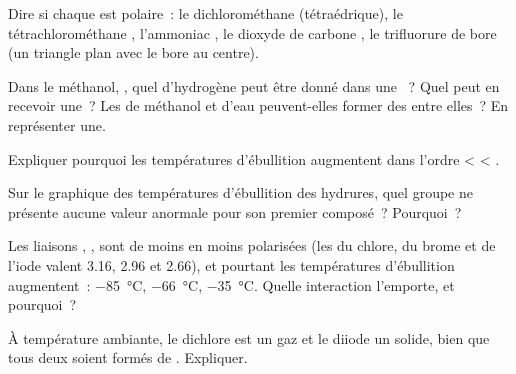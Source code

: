 \begin{exercise}[$\star\star$]\label{exo:g11:polarity-and-cohesion:6}
Dire si chaque  est polaire~: le dichlorométhane 
(tétraédrique), le tétrachlorométhane , l'ammoniac , le
dioxyde de carbone , le trifluorure de bore  (un
triangle plan avec le bore au centre).
\end{exercise}

\begin{exercise}[$\star\star$]\label{exo:g11:polarity-and-cohesion:7}
Dans le méthanol, , quel  d'hydrogène peut être donné
dans une ~? Quel  peut en recevoir une~? Les
 de méthanol et d'eau peuvent-elles former des  entre elles~? En représenter une.
\end{exercise}

\begin{exercise}[$\star\star$]\label{exo:g11:polarity-and-cohesion:8}
Expliquer pourquoi les températures d'ébullition augmentent dans
l'ordre  <  < .
\end{exercise}

\begin{exercise}[$\star\star$]\label{exo:g11:polarity-and-cohesion:9}
Sur le graphique des températures d'ébullition des hydrures, quel
groupe ne présente aucune valeur anormale pour son premier composé~?
Pourquoi~?
\end{exercise}

\begin{exercise}[$\star\star$]\label{exo:g11:polarity-and-cohesion:10}
Les liaisons , ,  sont de moins en moins
polarisées (les  du chlore, du brome et de l'iode
valent 3.16, 2.96 et 2.66), et pourtant les températures d'ébullition
augmentent~: \qty{-85}{\celsius}, \qty{-66}{\celsius},
\qty{-35}{\celsius}. Quelle interaction l'emporte, et pourquoi~?
\end{exercise}

\begin{exercise}[$\star\star$]\label{exo:g11:polarity-and-cohesion:11}
À température ambiante, le dichlore est un gaz et le diiode un solide,
bien que tous deux soient formés de  .
Expliquer.
\end{exercise}


